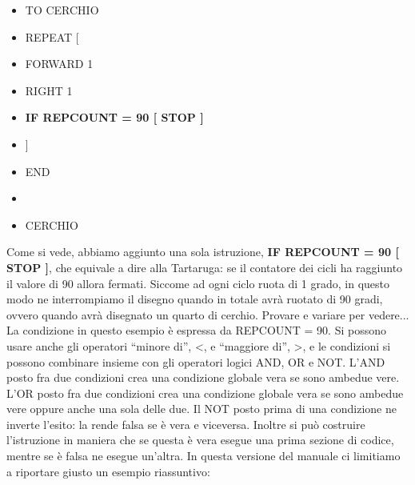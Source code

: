 \begin{scriptsize}
\begin{minipage}{0.50\textwidth}
\begin{itemize}[itemsep=-3pt,parsep=2pt, leftmargin=-0.0mm ]
\item[] TO CERCHIO                 
\item[] \hspace{8pt} 	REPEAT [ 
\item[] \hspace{8pt}\hspace{8pt}		FORWARD 1 
\item[] \hspace{8pt}\hspace{8pt}		RIGHT 1
\item[]	\hspace{8pt}\hspace{8pt}		\textbf{IF REPCOUNT = 90 [ STOP ]}
\item[] \hspace{8pt}	]
\item[] END                            
\item[] 
\item[] CERCHIO                       
\end{itemize}
\end{minipage}
\end{scriptsize}

\vskip 1cm

Come si vede, abbiamo aggiunto una sola istruzione, \textbf{IF REPCOUNT = 90 [ STOP ]}, che equivale a dire alla Tartaruga: se il contatore dei cicli ha raggiunto il valore di 90 allora fermati. Siccome ad ogni ciclo ruota di 1 grado, in questo modo ne interrompiamo il disegno quando in totale avrà ruotato di 90 gradi, ovvero quando avrà disegnato un quarto di cerchio. Provare e variare per vedere...
La condizione in questo esempio è espressa da REPCOUNT = 90. Si  possono usare anche gli operatori “minore di”, <, e “maggiore di”, >, e le condizioni si possono combinare insieme con gli operatori logici AND, OR e NOT. L'AND posto fra due condizioni crea una condizione globale vera se sono ambedue vere. L'OR posto fra due condizioni crea una condizione globale vera se sono ambedue vere oppure anche una sola delle due. Il NOT posto prima di una condizione ne inverte l'esito: la rende falsa se è vera e viceversa. Inoltre si può costruire l'istruzione in maniera che se questa è vera esegue una prima sezione di codice, mentre se è falsa ne  esegue un'altra. In questa versione del manuale ci limitiamo a riportare giusto un esempio riassuntivo:

